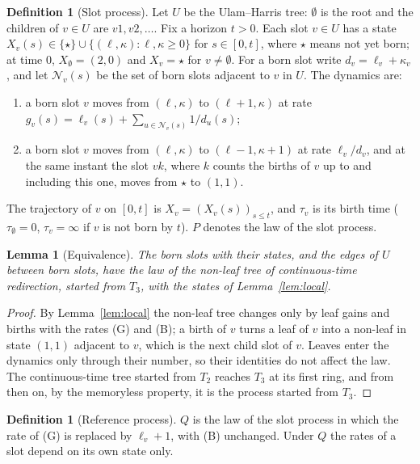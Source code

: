\documentclass[11pt]{article}
\theoremstyle{plain}
\newtheorem{lemma}[theorem]{Lemma}
\theoremstyle{definition}
\newtheorem{definition}[theorem]{Definition}
\theoremstyle{remark}
\begin{document}
\begin{definition}[Slot process]\label{def:slot}
Let $U$ be the Ulam--Harris tree: $\emptyset$ is the root and the children of $v\in U$ are $v1,v2,\dots$. Fix a horizon $t>0$. Each slot $v\in U$ has a state $X_v(s)\in\{\star\}\cup\{(\ell,\kappa):\ell,\kappa\ge0\}$ for $s\in[0,t]$, where $\star$ means not yet born; at time $0$, $X_\emptyset=(2,0)$ and $X_v=\star$ for $v\ne\emptyset$. For a born slot write $d_v=\ell_v+\kappa_v$, and let $\mathcal N_v(s)$ be the set of born slots adjacent to $v$ in $U$. The dynamics are:
\begin{enumerate}
\item[(G)] a born slot $v$ moves from $(\ell,\kappa)$ to $(\ell+1,\kappa)$ at rate $g_v(s)=\ell_v(s)+\sum_{u\in\mathcal N_v(s)}1/d_u(s)$;
\item[(B)] a born slot $v$ moves from $(\ell,\kappa)$ to $(\ell-1,\kappa+1)$ at rate $\ell_v/d_v$, and at the same instant the slot $vk$, where $k$ counts the births of $v$ up to and including this one, moves from $\star$ to $(1,1)$.
\end{enumerate}
The trajectory of $v$ on $[0,t]$ is $X_v=(X_v(s))_{s\le t}$, and $\tau_v$ is its birth time ($\tau_\emptyset=0$, $\tau_v=\infty$ if $v$ is not born by $t$). $P$ denotes the law of the slot process.
\end{definition}

\begin{lemma}[Equivalence]\label{lem:slot}
The born slots with their states, and the edges of $U$ between born slots, have the law of the non-leaf tree of continuous-time redirection, started from $T_3$, with the states of Lemma~\ref{lem:local}.
\end{lemma}

\begin{proof}
By Lemma~\ref{lem:local} the non-leaf tree changes only by leaf gains and births with the rates (G) and (B); a birth of $v$ turns a leaf of $v$ into a non-leaf in state $(1,1)$ adjacent to $v$, which is the next child slot of $v$. Leaves enter the dynamics only through their number, so their identities do not affect the law. The continuous-time tree started from $T_2$ reaches $T_3$ at its first ring, and from then on, by the memoryless property, it is the process started from $T_3$.
\end{proof}

\begin{definition}[Reference process]\label{def:Q}
$Q$ is the law of the slot process in which the rate of (G) is replaced by $\ell_v+1$, with (B) unchanged. Under $Q$ the rates of a slot depend on its own state only.
\end{definition}
\end{document}
